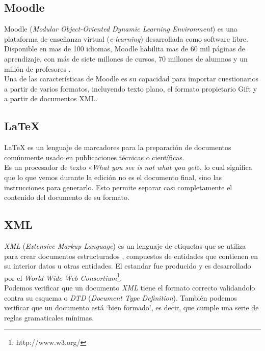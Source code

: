 \subsection{Moodle}
Moodle (\emph{Modular Object-Oriented Dynamic Learning Environment}) es una plataforma de enseñanza virtual (\emph{e-learning}) desarrollada como software libre.
Disponible en mas de 100 idiomas, Moodle habilita mas de 60 mil páginas de aprendizaje, con más de siete millones de cursos, 70 millones de alumnos y un millón de profesores \cite{website:moodle}.
\\
Una de las características de Moodle es su capacidad para importar cuestionarios a partir de varios formatos, incluyendo texto plano, el formato propietario Gift y a partir de documentos XML.

\subsection{\LaTeX{}}
\LaTeX{} es un lenguaje de marcadores para la preparación de documentos comúnmente usado en publicaciones técnicas o científicas.
\\
Es un procesador de texto «\emph{What you see is not what you get}», lo cual significa que lo que vemos durante la edición no es el 
documento final, sino las instrucciones para generarlo.
Esto permite separar casi completamente el contenido del documento de su formato.

\subsection{XML}
\emph{XML} (\emph{Extensive Markup Language}) es un lenguaje de etiquetas que se utiliza para crear documentos estructurados \cite{website:xml}, compuestos de entidades que contienen en su interior datos u otras entidades.
El estandar fue producido y es desarrollado por el \emph{World Wide Web Consortium}\footnote{http://www.w3.org/}.
\\
Podemos verificar que un documento \emph{XML} tiene el formato correcto validandolo contra su esquema o \emph{DTD} (\emph{Document Type Definition}).
También podemos verificar que un documento está `bien formado', es decir, que cumple una serie de reglas gramaticales mínimas.